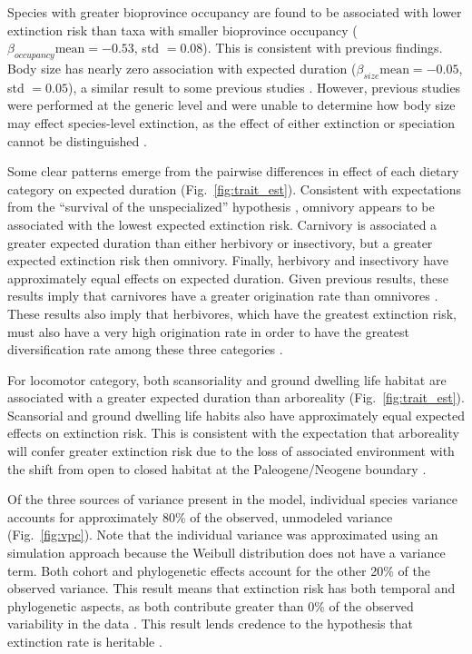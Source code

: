 \documentclass{pnastwo}
\begin{document}
\begin{article}
Species with greater bioprovince occupancy are found to be associated with lower extinction risk than taxa with smaller bioprovince occupancy (\(\beta_{occupancy} \text{mean} = -0.53\), std \(= 0.08\)). This is consistent with previous findings. Body size has nearly zero association with expected duration (\(\beta_{size} \text{mean} = -0.05\), std \(= 0.05\)), a similar result to some previous studies \cite{Tomiya2013}. However, previous studies were performed at the generic level and were unable to determine how body size may effect species-level extinction, as the effect of either extinction or speciation cannot be distinguished \cite{Liow2008,Tomiya2013}.

Some clear patterns emerge from the pairwise differences in effect of each dietary category on expected duration (Fig.~\ref{fig:trait_est}). Consistent with expectations from the ``survival of the unspecialized'' hypothesis \cite{Liow2004a,Simpson1944}, omnivory appears to be associated with the lowest expected extinction risk. Carnivory is associated a greater expected duration than either herbivory or insectivory, but a greater expected extinction risk then omnivory. Finally, herbivory and insectivory have approximately equal effects on expected duration. Given previous results, these results imply that carnivores have a greater origination rate than omnivores \cite{Price2012}. These results also imply that herbivores, which have the greatest extinction risk, must also have a very high origination rate in order to have the greatest diversification rate among these three categories \cite{Price2012}. 

For locomotor category, both scansoriality and ground dwelling life habitat are associated with a greater expected duration than arboreality (Fig.~\ref{fig:trait_est}). Scansorial and ground dwelling life habits also have approximately equal expected effects on extinction risk.  This is consistent with the expectation that arboreality will confer greater extinction risk due to the loss of associated environment with the shift from open to closed habitat at the Paleogene/Neogene boundary \cite{Blois2009}. 

Of the three sources of variance present in the model, individual species variance accounts for approximately 80\% of the observed, unmodeled variance (Fig.~\ref{fig:vpc}). Note that the individual variance was approximated using an simulation approach \cite{Goldstein2002} because the Weibull distribution does not have a variance term. Both cohort and phylogenetic effects account for the other 20\% of the observed variance. This result means that extinction risk has both temporal and phylogenetic aspects, as both contribute greater than 0\% of the observed variability in the data \cite{Housworth2004}. This result lends credence to the hypothesis that extinction rate is heritable \cite{Rabosky2009e}.


\end{article}
\end{document}
